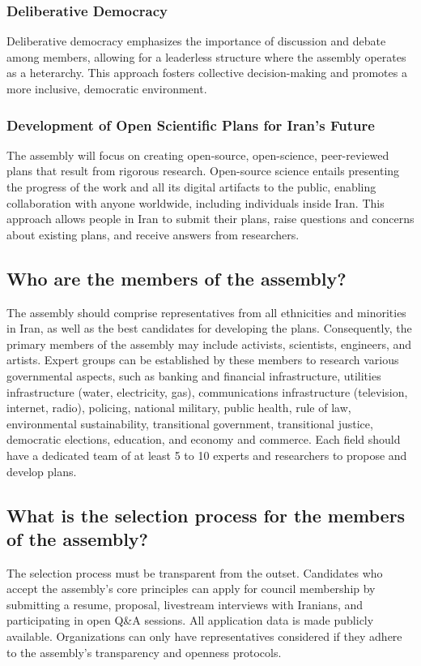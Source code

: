 \documentclass{IEEEtran}
\begin{document}
\subsubsection{Deliberative Democracy}
Deliberative democracy emphasizes the importance of discussion and debate among members, allowing for a leaderless structure where the assembly operates as a heterarchy. This approach fosters collective decision-making and promotes a more inclusive, democratic environment.

\subsubsection{Development of Open Scientific Plans for Iran's Future}
The assembly will focus on creating open-source, open-science, peer-reviewed plans that result from rigorous research. Open-source science entails presenting the progress of the work and all its digital artifacts to the public, enabling collaboration with anyone worldwide, including individuals inside Iran. This approach allows people in Iran to submit their plans, raise questions and concerns about existing plans, and receive answers from researchers.

\subsection{Who are the members of the assembly?}
The assembly should comprise representatives from all ethnicities and minorities in Iran, as well as the best candidates for developing the plans. Consequently, the primary members of the assembly may include activists, scientists, engineers, and artists. Expert groups can be established by these members to research various governmental aspects, such as banking and financial infrastructure, utilities infrastructure (water, electricity, gas), communications infrastructure (television, internet, radio), policing, national military, public health, rule of law, environmental sustainability, transitional government, transitional justice, democratic elections, education, and economy and commerce. Each field should have a dedicated team of at least 5 to 10 experts and researchers to propose and develop plans.

\subsection{What is the selection process for the members of the assembly?}
The selection process must be transparent from the outset. Candidates who accept the assembly's core principles can apply for council membership by submitting a resume, proposal, livestream interviews with Iranians, and participating in open Q&A sessions. All application data is made publicly available. Organizations can only have representatives considered if they adhere to the assembly's transparency and openness protocols.
\end{document}
